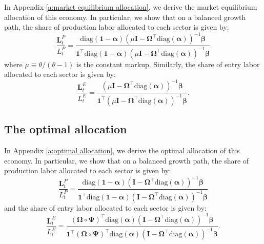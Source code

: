\documentclass[12pt]{article}
\begin{document}
In Appendix \ref{a:market equilibrium allocation}, we derive the market equilibrium allocation of this economy. In particular, we show that on a balanced growth path, the share of production labor allocated to each sector is given by:
\begin{equation*}
    \frac{\mathbf{L}_t^P}{L_t^P} = \frac{\text{diag}(\mathbf{1} - \bm{\alpha}) (\mu \mathbf{I} - \bm{\Omega}^{\top} \text{diag}(\bm{\alpha}))^{-1} \bm{\beta}}{\mathbf{1}^{\top} \text{diag}(\mathbf{1} - \bm{\alpha}) (\mu \mathbf{I} - \bm{\Omega}^{\top} \text{diag}(\bm{\alpha}))^{-1} \bm{\beta}}
\end{equation*}
where $\mu \equiv \theta / (\theta - 1)$ is the constant markup. Similarly, the share of entry labor allocated to each sector is given by:
\begin{equation*}
    \frac{\mathbf{L}_t^E}{L_t^E} = \frac{(\mu \mathbf{I} - \bm{\Omega}^{\top} \text{diag}(\bm{\alpha}))^{-1} \bm{\beta}}{\mathbf{1}^{\top} (\mu \mathbf{I} - \bm{\Omega}^{\top} \text{diag}(\bm{\alpha}))^{-1} \bm{\beta}}.
\end{equation*}

\subsection{The optimal allocation}

In Appendix \ref{a:optimal allocation}, we derive the optimal allocation of this economy. In particular, we show that on a balanced growth path, the share of production labor allocated to each sector is given by:
\begin{equation*}
    \frac{\mathbf{L}_t^P}{L_t^P} = \frac{\text{diag}(\mathbf{1} - \bm{\alpha}) (\mathbf{I} - \bm{\Omega}^{\top} \text{diag}(\bm{\alpha}))^{-1} \bm{\beta}}{\mathbf{1}^{\top} \text{diag}(\mathbf{1} - \bm{\alpha}) (\mathbf{I} - \bm{\Omega}^{\top} \text{diag}(\bm{\alpha}))^{-1} \bm{\beta}}
\end{equation*}
and the share of entry labor allocated to each sector is given by:
\begin{equation*}
    \frac{\mathbf{L}_t^E}{L_t^E} = \frac{(\bm{\Omega} \circ \bm{\Psi})^{\top} \text{diag}(\bm{\alpha}) (\mathbf{I} - \bm{\Omega}^{\top} \text{diag}(\bm{\alpha}))^{-1} \bm{\beta}}{\mathbf{1}^{\top} (\bm{\Omega} \circ \bm{\Psi})^{\top} \text{diag}(\bm{\alpha}) (\mathbf{I} - \bm{\Omega}^{\top} \text{diag}(\bm{\alpha}))^{-1} \bm{\beta}}.
\end{equation*}

\clearpage
\end{document}
